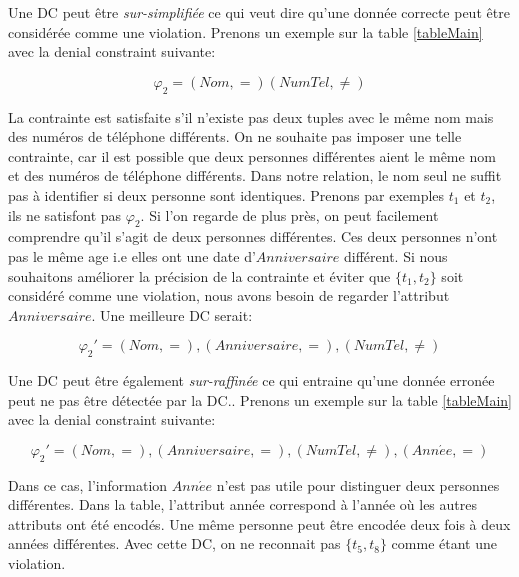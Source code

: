 \documentclass[letterpaper, 12pt]{report}
\theoremstyle{definition}
\begin{document}
Une DC peut être \emph{sur-simplifiée} ce qui veut dire qu'une donnée correcte peut être considérée comme une violation. Prenons un exemple sur la table \ref{tableMain} avec la denial constraint suivante:

$$\varphi_2 = (Nom,=)(NumTel,\neq) $$

La contrainte est satisfaite s'il n'existe pas deux tuples avec le même nom mais des numéros de téléphone différents. On ne souhaite pas imposer une telle contrainte, car il est possible que deux personnes différentes aient le même nom et des numéros de téléphone différents. Dans notre relation, le nom seul ne suffit pas à identifier si deux personne sont identiques. Prenons par exemples $t_1$ et $t_2$, ils ne satisfont pas $\varphi_2$. Si l'on regarde de plus près, on peut facilement comprendre qu'il s'agit de deux personnes différentes. Ces deux personnes n'ont pas le même age i.e elles ont une date d'$Anniversaire$ différent. Si nous souhaitons améliorer la précision de la contrainte et éviter que $\{ t_1,t_2 \}$ soit considéré comme une violation, nous avons besoin de regarder l'attribut $Anniversaire$. Une meilleure DC serait:

$$\varphi_2' = (Nom,=),(Anniversaire,=),(NumTel,\neq) $$

Une DC peut être également \emph{sur-raffinée} ce qui entraine qu'une donnée erronée peut ne pas être détectée par la DC.. Prenons un exemple sur la table \ref{tableMain} avec la denial constraint suivante:

$$\varphi_2' = (Nom,=),(Anniversaire,=),(NumTel,\neq),(Ann\acute{e}e,=) $$

Dans ce cas, l'information $Ann\acute{e}e$ n'est pas utile pour distinguer deux personnes différentes. Dans la table, l'attribut année correspond à l'année où les autres attributs ont été encodés. Une même personne peut être encodée deux fois à deux années différentes. Avec cette DC, on ne reconnait pas $\{ t_5,t_8 \}$ comme étant une violation.

\end{document}
